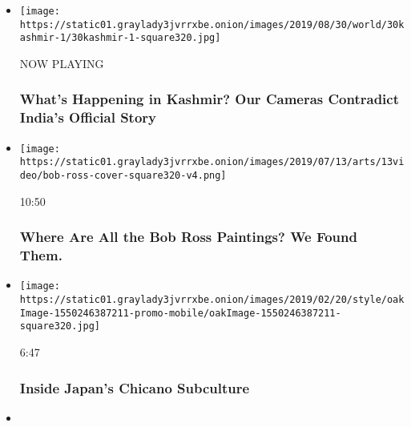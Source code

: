 \begin{itemize}
\item
  \texttt{[image: https://static01.graylady3jvrrxbe.onion/images/2019/08/30/world/30kashmir-1/30kashmir-1-square320.jpg]}

  NOW PLAYING

  \hypertarget{whats-happening-in-kashmir-our-cameras-contradict-indias-official-story-2}{%
  \subsubsection{What's Happening in Kashmir? Our Cameras Contradict
  India's Official
  Story}\label{whats-happening-in-kashmir-our-cameras-contradict-indias-official-story-2}}
\item
  \href{https://www.nytimes3xbfgragh.onion/video/arts/100000005865824/bob-ross-paintings-mystery.html?action=click\&module=video-series-bar\&region=header\&pgtype=Article\&playlistId=video/Most-Viewed}{}

  \texttt{[image: https://static01.graylady3jvrrxbe.onion/images/2019/07/13/arts/13video/bob-ross-cover-square320-v4.png]}

  10:50

  \hypertarget{where-are-all-the-bob-ross-paintings-we-found-them}{%
  \subsubsection{Where Are All the Bob Ross Paintings? We Found
  Them.}\label{where-are-all-the-bob-ross-paintings-we-found-them}}
\item
  \href{https://www.nytimes3xbfgragh.onion/video/style/100000005806771/japan-chicano-culture.html?action=click\&module=video-series-bar\&region=header\&pgtype=Article\&playlistId=video/Most-Viewed}{}

  \texttt{[image: https://static01.graylady3jvrrxbe.onion/images/2019/02/20/style/oakImage-1550246387211-promo-mobile/oakImage-1550246387211-square320.jpg]}

  6:47

  \hypertarget{inside-japans-chicano-subculture}{%
  \subsubsection{Inside Japan's Chicano
  Subculture}\label{inside-japans-chicano-subculture}}
\item
  \href{https://www.nytimes3xbfgragh.onion/video/us/100000006207277/louisiana-school-viral-video-landry.html?action=click\&module=video-series-bar\&region=header\&pgtype=Article\&playlistId=video/Most-Viewed}{}


\end{itemize}
